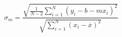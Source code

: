 \documentclass{scrartcl}
\begin{document}
  \begin{equation}
    \displaystyle
    \sigma_m = \frac{\sqrt{\frac{1}{N-2} \sum^N_{i=1} (y_i - b - mx_i)^2}}{\sqrt{\sum_{i=1}^N (x_i - \overline{x})^2}}
  \end{equation}
\end{document}
